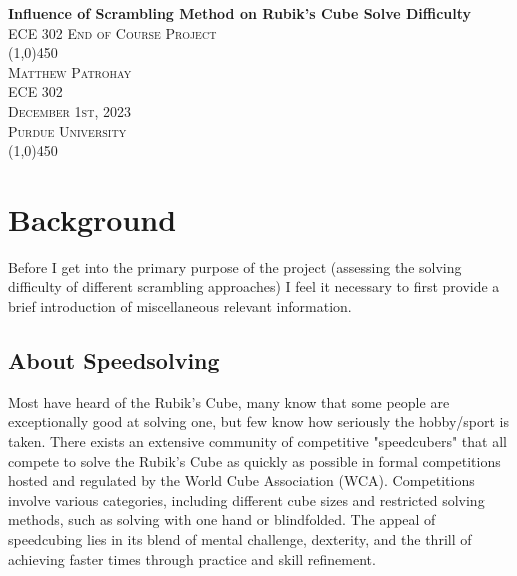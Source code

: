 \documentclass[12pt,letterpaper]{article}
\numberwithin{equation}{section}
\begin{document}
\begin{titlepage}

	\begin{center}
	\begin{spacing}{1.0}

		\vspace*{0.6in}
		\huge{\bfseries Influence of Scrambling Method on Rubik's Cube Solve Difficulty}\\
			[10mm]
		\textsc{\large ECE 302 End of Course Project}\\
			[2.5in]
	
		\line(1,0){450}\\
			[0.5in]
		\textsc{\large Matthew Patrohay}\\
		\textsc{\large ECE 302}\\
		\textsc{\large December 1st, 2023}\\
			[0.5in]
		\textsc{\large Purdue University}\\
			[0.5in]

			
		\line(1,0){450}\\
	\end{spacing}
	\end{center}
	
\end{titlepage}
\newpage
\tableofcontents


\newpage

\section{Background}

Before I get into the primary purpose of the project (assessing the solving difficulty of different scrambling approaches) I feel it necessary to first provide a brief introduction of miscellaneous relevant information. 

\subsection{About Speedsolving}

Most have heard of the Rubik's Cube, many know that some people are exceptionally good at solving one, but few know how seriously the hobby/sport is taken. There exists an extensive community of competitive "speedcubers" that all compete to solve the Rubik's Cube as quickly as possible in formal competitions hosted and regulated by the World Cube Association (WCA). Competitions involve various categories, including different cube sizes and restricted solving methods, such as solving with one hand or blindfolded. The appeal of speedcubing lies in its blend of mental challenge, dexterity, and the thrill of achieving faster times through practice and skill refinement.
\end{document}
